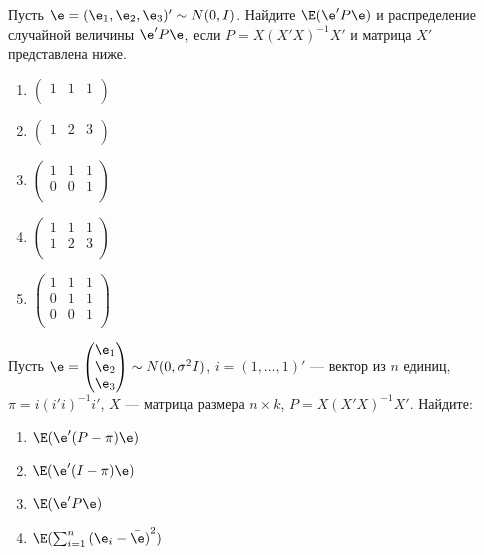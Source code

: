 \documentclass[pdftex,11pt,openany]{book}\usepackage[]{graphicx}\usepackage[]{color}
\begin{document}
\begin{problem}
Пусть $\e = (\e_1, \e_2, \e_3)'\sim N (0,I)$. Найдите $\E(\e'P\e)$ и распределение случайной величины $\e'P\e$, если $P = X(X'X)^{-1}X'$ и матрица $X'$ представлена ниже.
\begin{enumerate}
\item
\ensuremath{%
\begin{pmatrix}{}
    1 &   1 &   1 \\ 
  \end{pmatrix}
}
\item
\ensuremath{%
\begin{pmatrix}{}
    1 &   2 &   3 \\ 
  \end{pmatrix}
}
\item
\ensuremath{%
\begin{pmatrix}{}
    1 &   1 &   1 \\ 
    0 &   0 &   1 \\ 
  \end{pmatrix}
}
\item
\ensuremath{%
\begin{pmatrix}{}
    1 &   1 &   1 \\ 
    1 &   2 &   3 \\ 
  \end{pmatrix}
}
\item
\ensuremath{%
\begin{pmatrix}{}
    1 &   1 &   1 \\ 
    0 &   1 &   1 \\ 
    0 &   0 &   1 \\ 
  \end{pmatrix}
}
\end{enumerate}
\end{problem}

\begin{solution}
\end{solution}


\begin{problem}
Пусть $\e = \begin{pmatrix} \e_1 \\ \e_2 \\ \e_3 \end{pmatrix} \sim N (0,\sigma^2 I)$, $i = (1,\dots,1)'$ --- вектор из $n$ единиц, $\pi=i(i'i)^{-1}i'$,
$X$ --- матрица размера ${n \times k}$, $P = X(X'X)^{-1}X'$. Найдите:
\begin{enumerate}
\item $\E(\e'(P - \pi)\e)$ 
\item $\E(\e'(I - \pi)\e)$
\item $\E(\e'P \e)$
\item $\E(\sum_{i=1}^n {(\e_i - \bar{\e})}^2)$
\end{enumerate}
\end{problem}
\end{document}
